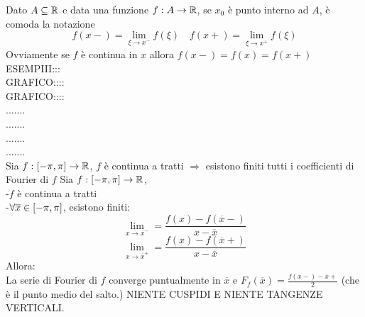 \observation
Dato $A\subseteq \mathbb{R}$ e data una funzione $f:A\to \mathbb{R}$, se $x_0$ è punto interno ad $A$, è comoda la notazione
$$f(x-)=\lim\limits_{\xi\to x^{-}}f(\xi)\quad f(x+)=\lim\limits_{\xi\to x^{+}}f(\xi)$$
Ovviamente se $f$ è continua in $x$ allora $f(x-)=f(x)=f(x+)$
ESEMPIII:::\\
GRAFICO::::\\
GRAFICO::::\\
.......\\
.......\\
.......\\
.......\\
\proposition
Sia $f:\left[-\pi,\pi\right]\to \mathbb{R}$, $f$ è continua a tratti $\Rightarrow$ esistono finiti tutti i coefficienti di Fourier di $f$
\proposition
Sia $f:\left[-\pi,\pi\right]\to \mathbb{R}$,\\
-$f$ è continua a tratti\\
-$\forall \overline{x} \in\left[-\pi,\pi\right]$, esistono finiti:\\
$$ \lim\limits_{x\to\overline{x}^{-}}=\frac{f(x)-f(\overline{x}-)}{x-\overline{x}} $$
$$ \lim\limits_{x\to\overline{x}^{+}}=\frac{f(x)-f(\overline{x}+)}{x-\overline{x}} $$
Allora:\\
La serie di Fourier di $f$ converge puntualmente in $\overline{x}$ e $F_f(\overline{x})=\frac{f(\overline{x}-)-\overline{x}+}{2}$ (che è il punto medio del salto.)
\observation NIENTE CUSPIDI E NIENTE TANGENZE VERTICALI.

